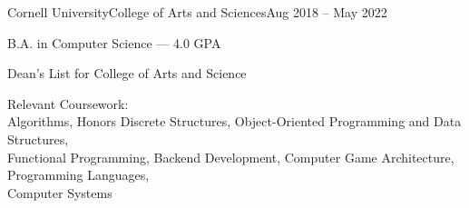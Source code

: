 \documentclass{resume}
\begin{document}
\begin{education}
    \begin{entryleft}{Cornell University}{College of Arts and
        Sciences}{Aug 2018 -- May 2022}

        \begin{description}
            \item B.A. in Computer Science --- 4.0 GPA
            \item Dean's List for College of Arts and Science
            \item Relevant Coursework: \\ \vspace{1pt} 
                Algorithms, Honors Discrete Structures, Object-Oriented
                Programming and Data Structures, \\
                Functional Programming, Backend Development,
                Computer Game Architecture, Programming Languages, \\
                Computer Systems
        \end{description}
    \end{entryleft}

\end{education}
\end{document}
